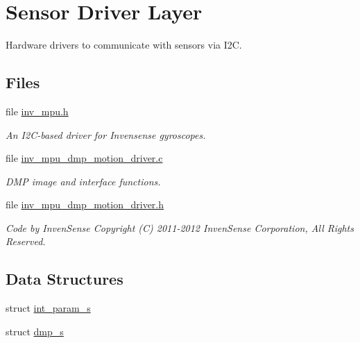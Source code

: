 \hypertarget{group___d_r_i_v_e_r_s}{}\section{Sensor Driver Layer}
\label{group___d_r_i_v_e_r_s}


Hardware drivers to communicate with sensors via I2C.  


\subsection*{Files}
\begin{DoxyCompactItemize}
\item 
file \hyperlink{inv__mpu_8h}{inv\+\_\+mpu.\+h}
\begin{DoxyCompactList}\small\item\em An I2\+C-\/based driver for Invensense gyroscopes. \end{DoxyCompactList}\item 
file \hyperlink{inv__mpu__dmp__motion__driver_8c}{inv\+\_\+mpu\+\_\+dmp\+\_\+motion\+\_\+driver.\+c}
\begin{DoxyCompactList}\small\item\em D\+MP image and interface functions. \end{DoxyCompactList}\item 
file \hyperlink{inv__mpu__dmp__motion__driver_8h}{inv\+\_\+mpu\+\_\+dmp\+\_\+motion\+\_\+driver.\+h}
\begin{DoxyCompactList}\small\item\em Code by Inven\+Sense  Copyright (C) 2011-\/2012 Inven\+Sense Corporation, All Rights Reserved. \end{DoxyCompactList}\end{DoxyCompactItemize}
\subsection*{Data Structures}
\begin{DoxyCompactItemize}
\item 
struct \hyperlink{structint__param__s}{int\+\_\+param\+\_\+s}
\item 
struct \hyperlink{structdmp__s}{dmp\+\_\+s}
\end{DoxyCompactItemize}
